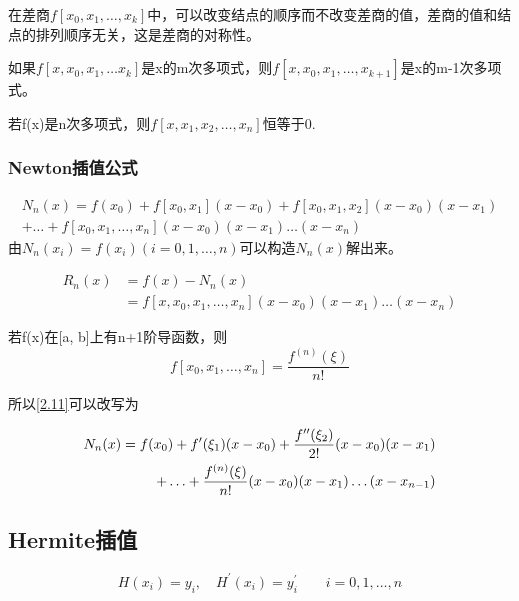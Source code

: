 \documentclass[12pt]{report}
\numberwithin{equation}{section}
\begin{document}
	在差商$f[x_0, x_1, \ldots , x_k]$中，可以改变结点的顺序而不改变差商的值，差商的值和结点的排列顺序无关，这是差商的对称性。

	如果$f[x, x_0, x_1, \ldots x_k]$是x的m次多项式，则$f[x, x_0, x_1, \ldots , x_{k+1}]$是x的m-1次多项式。

	若f(x)是n次多项式，则$f[x, x_1, x_2, \ldots , x_n]$恒等于0.

	\subsubsection{Newton插值公式}

	\begin{equation} \tag{2.11} \label{2.11}
		\begin{aligned}
			N_n(x) = f(x_0) + f[x_0, x_1](x - x_0) + f[x_0, x_1, x_2](x - x_0)(x - x_1) \\  
			+\ldots + f[x_0, x_1, \ldots , x_n](x - x_0)(x - x_1)\ldots (x - x_n)
		\end{aligned}
	\end{equation}
	由$N_n(x_i) = f(x_i) (i = 0, 1, \ldots , n)$可以构造$N_n(x)$解出来。
	
	\begin{equation} \tag{2.12} \label{2.12}
		\begin{aligned}
			R_n(x) &= f(x) - N_n(x) \\
			&= f[x, x_0, x_1, \ldots , x_n](x - x_0)(x - x_1) \ldots (x - x_n) 
		\end{aligned}
	\end{equation}

	若f(x)在[a, b]上有n+1阶导函数，则
	$$
	f[x_0, x_1, \ldots , x_n] = \frac{f^{(n)}(\xi)}{n!}
	$$

	所以\eqref{2.11}可以改写为

	\begin{equation}
		\begin{aligned}
			\notag
			N_n(x) = f(x_0) + f^\prime (\xi_1)(x - x_0) + \frac{f^{\prime \prime}(\xi_2)}{2!}(x - x_0)(x - x_1) \\
			+ \ldots + \frac{f^{(n)}(\xi)}{n!}(x - x_0)(x - x_1)\ldots (x - x_{n-1})
		\end{aligned}
	\end{equation}

	\subsection{Hermite插值}
	$$
	H(x_i) = y_i, \quad H^\prime (x_i) = y^\prime_i \quad \quad i = 0, 1, \ldots , n
	$$
\end{document}
